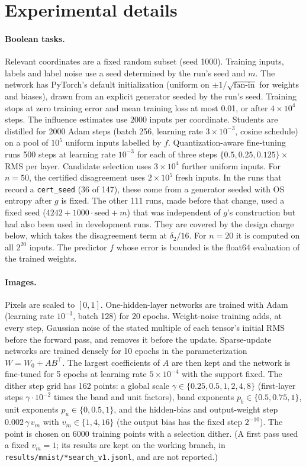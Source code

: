 \section{Experimental details}\label{app:details}

\paragraph{Boolean tasks.} Relevant coordinates are a fixed random subset (seed 1000). Training inputs, labels and label noise use a seed determined by the run's seed and $m$. The network has PyTorch's default initialization (uniform on $\pm1/\sqrt{\text{fan-in}}$ for weights and biases), drawn from an explicit generator seeded by the run's seed. Training stops at zero training error and mean training loss at most 0.01, or after $4\times10^4$ steps. The influence estimates use $2000$ inputs per coordinate. Students are distilled for 2000 Adam steps (batch 256, learning rate $3\times10^{-3}$, cosine schedule) on a pool of $10^5$ uniform inputs labelled by $f$. Quantization-aware fine-tuning runs 500 steps at learning rate $10^{-3}$ for each of three steps $\{0.5,0.25,0.125\}\times$RMS per layer. Candidate selection uses $3\times10^4$ further uniform inputs. For $n=50$, the certified disagreement uses $2\times10^5$ fresh inputs. In the runs that record a \texttt{cert\_seed} (36 of 147), these come from a generator seeded with OS entropy after $g$ is fixed. The other 111 runs, made before that change, used a fixed seed ($4242+1000\cdot\text{seed}+m$) that was independent of $g$'s construction but had also been used in development runs. They are covered by the design charge below, which takes the disagreement term at $\delta_2/16$. For $n=20$ it is computed on all $2^{20}$ inputs. The predictor $f$ whose error is bounded is the float64 evaluation of the trained weights.

\paragraph{Images.} Pixels are scaled to $[0,1]$. One-hidden-layer networks are trained with Adam (learning rate $10^{-3}$, batch 128) for 20 epochs. Weight-noise training adds, at every step, Gaussian noise of the stated multiple of each tensor's initial RMS before the forward pass, and removes it before the update. Sparse-update networks are trained densely for 10 epochs in the parameterization $W=W_0+AB^\top$. The largest coefficients of $A$ are then kept and the network is fine-tuned for 5 epochs at learning rate $5\times10^{-4}$ with the support fixed. The dither step grid has 162 points: a global scale $\gamma\in\{0.25,0.5,1,2,4,8\}$ (first-layer steps $\gamma\cdot10^{-2}$ times the band and unit factors), band exponents $p_b\in\{0.5,0.75,1\}$, unit exponents $p_u\in\{0,0.5,1\}$, and the hidden-bias and output-weight step $0.002\,\gamma\,v_m$ with $v_m\in\{1,4,16\}$ (the output bias has the fixed step $2^{-10}$). The point is chosen on 6000 training points with a selection dither. (A first pass used a fixed $v_m=1$; its results are kept on the working branch, in \texttt{results/mnist/*search\_v1.jsonl}, and are not reported.)

